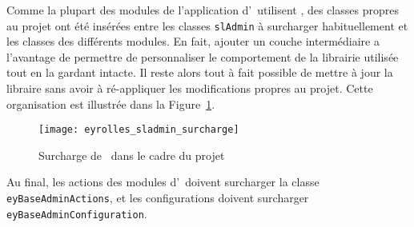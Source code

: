 Comme la plupart des modules de l'application d'\aey\ utilisent \asladmin, des classes propres au projet ont été insérées entre les classes \texttt{slAdmin} à surcharger habituellement et les classes des différents modules. En fait, ajouter un couche intermédiaire a l'avantage de permettre de personnaliser le comportement de la librairie utilisée tout en la gardant intacte. Il reste alors tout à fait possible de mettre à jour la libraire sans avoir à ré-appliquer les modifications propres au projet. Cette organisation est illustrée dans la Figure~\ref{figure:eyrolles_sladmin_surcharge}.

\begin{figure}
	\centering
	\texttt{[image: eyrolles\_sladmin\_surcharge]}
	\caption{Surcharge de \asladmin\ dans le cadre du projet \aey}
	\label{figure:eyrolles_sladmin_surcharge}
\end{figure}

Au final, les actions des modules d'\aey\ doivent surcharger la classe \texttt{eyBaseAdminActions}, et les configurations doivent surcharger \texttt{ey\-Base\-Admin\-Configuration}.
